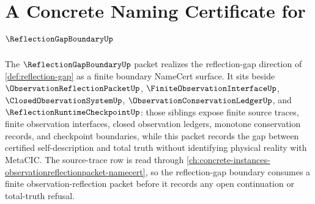 \chapter{A Concrete Naming Certificate for $\ReflectionGapBoundaryUp$}
\label{ch:concrete-instances-reflection-gap-boundary-namecert}

The $\ReflectionGapBoundaryUp$ packet realizes the reflection-gap direction of \autoref{def:reflection-gap} as a finite boundary NameCert surface. It sits beside $\ObservationReflectionPacketUp$, $\FiniteObservationInterfaceUp$, $\ClosedObservationSystemUp$, $\ObservationConservationLedgerUp$, and $\ReflectionRuntimeCheckpointUp$: those siblings expose finite source traces, finite observation interfaces, closed observation ledgers, monotone conservation records, and checkpoint boundaries, while this packet records the gap between certified self-description and total truth without identifying physical reality with MetaCIC. The source-trace row is read through \autoref{ch:concrete-instances-observationreflectionpacket-namecert}, so the reflection-gap boundary consumes a finite observation-reflection packet before it records any open continuation or total-truth refusal.

